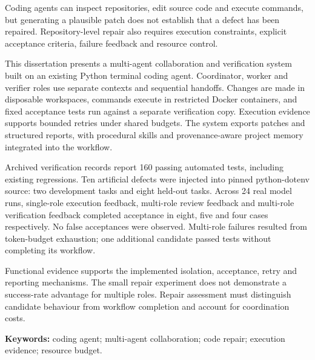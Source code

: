 Coding agents can inspect repositories, edit source code and execute commands, but generating a plausible patch does not establish that a defect has been repaired. Repository-level repair also requires execution constraints, explicit acceptance criteria, failure feedback and resource control.

This dissertation presents a multi-agent collaboration and verification system built on an existing Python terminal coding agent. Coordinator, worker and verifier roles use separate contexts and sequential handoffs. Changes are made in disposable workspaces, commands execute in restricted Docker containers, and fixed acceptance tests run against a separate verification copy. Execution evidence supports bounded retries under shared budgets. The system exports patches and structured reports, with procedural skills and provenance-aware project memory integrated into the workflow.

Archived verification records report 160 passing automated tests, including existing regressions. Ten artificial defects were injected into pinned python-dotenv source: two development tasks and eight held-out tasks. Across 24 real model runs, single-role execution feedback, multi-role review feedback and multi-role verification feedback completed acceptance in eight, five and four cases respectively. No false acceptances were observed. Multi-role failures resulted from token-budget exhaustion; one additional candidate passed tests without completing its workflow.

Functional evidence supports the implemented isolation, acceptance, retry and reporting mechanisms. The small repair experiment does not demonstrate a success-rate advantage for multiple roles. Repair assessment must distinguish candidate behaviour from workflow completion and account for coordination costs.

\textbf{Keywords:} coding agent; multi-agent collaboration; code repair; execution evidence; resource budget.
